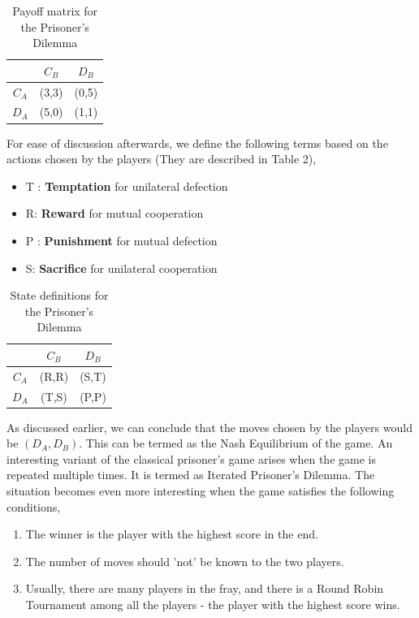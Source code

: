 \documentclass[a4paper]{article}
\begin{document}
	\tabcolsep=0.51cm
	\begin{table}[H]
	\centering
	\begin{tabular}{|c|c|c|}
	\hline
					& $C_{B}$           		& $D_{B}$ 					\\ \hline
	$C_{A}$  		& (3,3) 		 			& (0,5)         			\\ \hline
	$D_{A}$			& (5,0)           			& (1,1)            			\\ \hline
	\end{tabular}
	\caption{Payoff matrix for the Prisoner's Dilemma}
	\end{table}
		
	For ease of discussion afterwards, we define the following terms \cite{optimalipd} based on the actions chosen by the players (They are described in Table 2),
	\begin{itemize}
		\item T : \textbf{Temptation} for unilateral defection
		\item R: \textbf{Reward} for mutual cooperation
		\item P : \textbf{Punishment} for mutual defection
		\item S: \textbf{Sacrifice} for unilateral cooperation	
	\end{itemize}
	
	\begin{table}[H]
	\centering
	\begin{tabular}{|c|c|c|}
	\hline
					& $C_{B}$           		& $D_{B}$ 					\\ \hline
	$C_{A}$  		& (R,R) 		 			& (S,T)         			\\ \hline
	$D_{A}$ 		& (T,S)           			& (P,P)            			\\ \hline
	\end{tabular}
	\caption{State definitions for the Prisoner's Dilemma}
	\end{table}

	As discussed earlier, we can conclude that the moves chosen by the players would be $(D_{A},D_{B})$. This can be termed as the Nash Equilibrium of the game. An interesting variant of the classical prisoner's game arises when the game is repeated multiple times. It is termed as Iterated Prisoner's Dilemma. The situation becomes even more interesting when the game satisfies the following conditions,
	\begin{enumerate}
	\item The winner is the player with the highest score in the end.
	\item The number of moves should 'not' be known to the two players.
	\item Usually, there are many players in the fray, and there is a Round Robin Tournament among all the players - the player with the highest score wins.		
	\end{enumerate}
	
\end{document}
